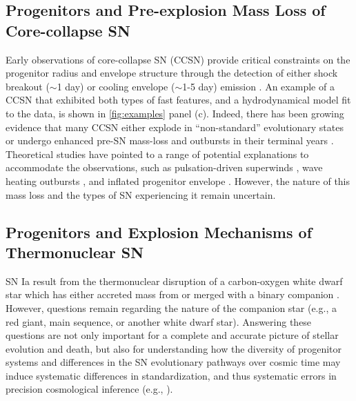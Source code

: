 \documentclass[letterpaper,longauthor,trackchanges,twocolumn,onecolappendix,sort&compress]{aastex62}
\begin{document}

\subsection{Progenitors and Pre-explosion Mass Loss of Core-collapse SN} 

Early observations of core-collapse SN (CCSN) provide critical constraints on the progenitor radius and envelope structure through the detection of either shock breakout ($\sim$1 day) or cooling envelope ($\sim$1-5 day) emission \citep{Modjaz2009,Nakar2010,Arcavi2011,Bersten2018}. An example of a CCSN that exhibited both types of fast features, and a hydrodynamical model fit to the data, is shown in \autoref{fig:examples} panel (c). Indeed, there has been growing evidence that many CCSN either explode in ``non-standard'' evolutionary states or undergo enhanced pre-SN mass-loss and outbursts in their terminal years \citep{Nakar2014,Khazov2016}. Theoretical studies have pointed to a range of potential explanations to accommodate the observations, such as pulsation-driven superwinds \citep{Yoon2010}, wave heating outbursts \citep{Fuller2017}, and inflated progenitor envelope \citep{Grafener2012}. However, the nature of this mass loss and the types of SN experiencing it remain uncertain.

\subsection{Progenitors and Explosion Mechanisms of Thermonuclear SN}

SN Ia result from the thermonuclear disruption of a carbon-oxygen white dwarf star which has either accreted mass from or merged with a binary companion \citep{Hillebrandt2000}. However, questions remain regarding the nature of the companion star (e.g., a red giant, main sequence, or another white dwarf star). Answering these questions are not only important for a complete and accurate picture of stellar evolution and death, but also for understanding how the diversity of progenitor systems and differences in the SN evolutionary pathways over cosmic time may induce systematic differences in standardization, and thus systematic errors in precision cosmological inference (e.g., \citealt{2011PhDT........37D,2013PhDT.......326H}).
\end{document}
